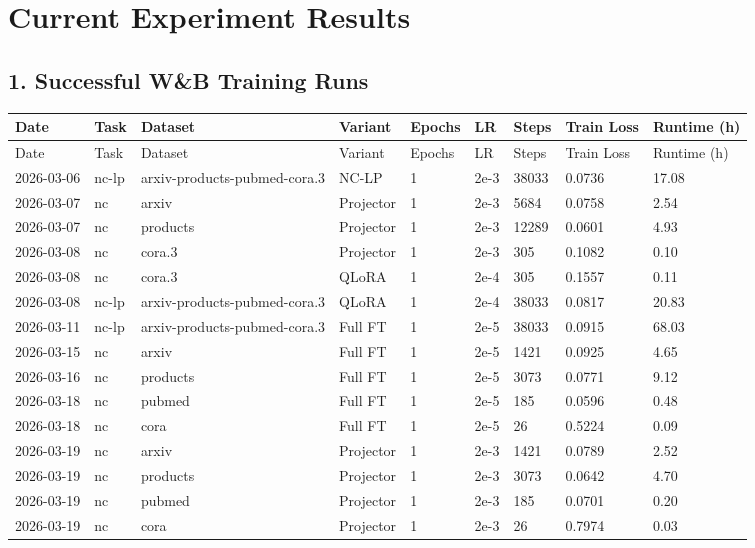 
\section*{Current Experiment Results}

\subsection*{1. Successful W\&B Training Runs}

\begin{longtable}{lllllllll}
\toprule
Date & Task & Dataset & Variant & Epochs & LR & Steps & Train Loss & Runtime (h) \\
\midrule
\endfirsthead
\toprule
Date & Task & Dataset & Variant & Epochs & LR & Steps & Train Loss & Runtime (h) \\
\midrule
\endhead
2026-03-06 & nc-lp & arxiv-products-pubmed-cora.3 & NC-LP & 1 & 2e-3 & 38033 & 0.0736 & 17.08 \\
2026-03-07 & nc & arxiv & Projector & 1 & 2e-3 & 5684 & 0.0758 & 2.54 \\
2026-03-07 & nc & products & Projector & 1 & 2e-3 & 12289 & 0.0601 & 4.93 \\
2026-03-08 & nc & cora.3 & Projector & 1 & 2e-3 & 305 & 0.1082 & 0.10 \\
2026-03-08 & nc & cora.3 & QLoRA & 1 & 2e-4 & 305 & 0.1557 & 0.11 \\
2026-03-08 & nc-lp & arxiv-products-pubmed-cora.3 & QLoRA & 1 & 2e-4 & 38033 & 0.0817 & 20.83 \\
2026-03-11 & nc-lp & arxiv-products-pubmed-cora.3 & Full FT & 1 & 2e-5 & 38033 & 0.0915 & 68.03 \\
2026-03-15 & nc & arxiv & Full FT & 1 & 2e-5 & 1421 & 0.0925 & 4.65 \\
2026-03-16 & nc & products & Full FT & 1 & 2e-5 & 3073 & 0.0771 & 9.12 \\
2026-03-18 & nc & pubmed & Full FT & 1 & 2e-5 & 185 & 0.0596 & 0.48 \\
2026-03-18 & nc & cora & Full FT & 1 & 2e-5 & 26 & 0.5224 & 0.09 \\
2026-03-19 & nc & arxiv & Projector & 1 & 2e-3 & 1421 & 0.0789 & 2.52 \\
2026-03-19 & nc & products & Projector & 1 & 2e-3 & 3073 & 0.0642 & 4.70 \\
2026-03-19 & nc & pubmed & Projector & 1 & 2e-3 & 185 & 0.0701 & 0.20 \\
2026-03-19 & nc & cora & Projector & 1 & 2e-3 & 26 & 0.7974 & 0.03 \\

\end{longtable}
